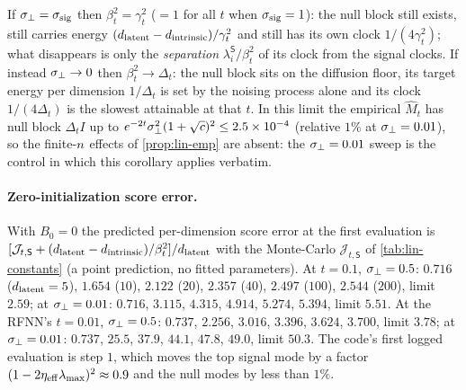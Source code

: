 \begin{remark}\label{rem:lin-iso}
If $\sigma_{\perp}=\sigma_{\mathrm{sig}}$ then $\beta_t^2=\gamma_t^2$ ($=1$ for all $t$ when $\sigma_{\mathrm{sig}}=1$): the null block still exists, still carries energy $(d_{\mathrm{latent}}-d_{\mathrm{intrinsic}})/\gamma_t^2$ and still has its own clock $1/(4\gamma_t^2)$; what disappears is only the \emph{separation} $\lambda^{\mathsf S}_i/\beta_t^2$ of its clock from the signal clocks. If instead $\sigma_{\perp}\to0$ then $\beta_t^2\to\Delta_t$: the null block sits on the diffusion floor, its target energy per dimension $1/\Delta_t$ is set by the noising process alone and its clock $1/(4\Delta_t)$ is the slowest attainable at that $t$. In this limit the empirical $\widehat M_t$ has null block $\Delta_tI$ up to $e^{-2t}\sigma_{\perp}^2(1+\sqrt c)^2\le2.5\times10^{-4}$ (relative $1\%$ at $\sigma_{\perp}=0.01$), so the finite-$n$ effects of \cref{prop:lin-emp} are absent: the $\sigma_{\perp}=0.01$ sweep is the control in which this corollary applies verbatim.
\end{remark}

\paragraph{Zero-initialization score error.}
With $B_0=0$ the predicted per-dimension score error at the first evaluation is $[\mathcal J_{t,\mathsf S}+(d_{\mathrm{latent}}-d_{\mathrm{intrinsic}})/\beta_t^2]/d_{\mathrm{latent}}$ with the Monte-Carlo $\mathcal J_{t,\mathsf S}$ of \cref{tab:lin-constants} (a point prediction, no fitted parameters). At $t=0.1$, $\sigma_{\perp}=0.5$: $0.716$ ($d_{\mathrm{latent}}=5$), $1.654$ ($10$), $2.122$ ($20$), $2.357$ ($40$), $2.497$ ($100$), $2.544$ ($200$), limit $2.59$; at $\sigma_{\perp}=0.01$: $0.716$, $3.115$, $4.315$, $4.914$, $5.274$, $5.394$, limit $5.51$. At the RFNN's $t=0.01$, $\sigma_{\perp}=0.5$: $0.737$, $2.256$, $3.016$, $3.396$, $3.624$, $3.700$, limit $3.78$; at $\sigma_{\perp}=0.01$: $0.737$, $25.5$, $37.9$, $44.1$, $47.8$, $49.0$, limit $50.3$. The code's first logged evaluation is step $1$, which moves the top signal mode by a factor $(1-2\eta_{\rm eff}\lambda_{\max})^2\approx0.9$ and the null modes by less than $1\%$.

